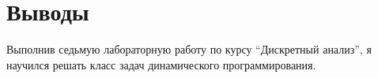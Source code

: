 \section{Выводы}

Выполнив седьмую лабораторную работу по курсу \enquote{Дискретный анализ}, я научился решать класс задач динамического программирования.

\pagebreak
